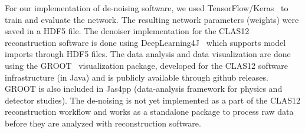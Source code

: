 For our implementation of de-noising software, we used TensorFlow/Keras~\cite{keras-website} to train 
and evaluate the network. The resulting network parameters (weights) were saved 
in a HDF5 file. The denoiser implementation for the CLAS12 reconstruction software is 
done using DeepLearning4J~\cite{dl4j-website} which supports model imports 
through HDF5 files. 
The data analysis and data visualization are done using the GROOT~\cite{groot-github} visualization 
package, developed for the CLAS12 software infrastructure (in Java) and is publicly available 
through github releases. GROOT is also included in Jas4pp\cite{Chekanov:2020bja}  
(data-analysis framework for physics and detector studies). The de-noising is not yet implemented 
as a part of the CLAS12 reconstruction workflow and works as a standalone package to process raw data before 
they are analyzed with reconstruction software.
